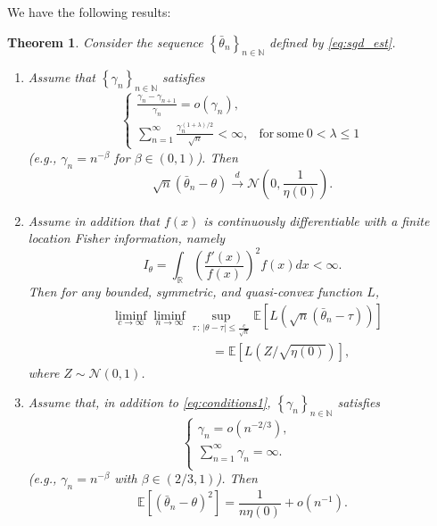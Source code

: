 \documentclass[letterpaper, 11pt]{IEEEtran}      %
\newtheorem{thm}{\bf{Theorem}}
\newcommand{\ex}[1]{\ensuremath{\mathbb{E}\left[ #1\right]}}
\newcommand{\Ncal}{\mathcal{N}}
\begin{document}
We have the following results:
\begin{thm} \label{thm:sgd}
Consider the sequence $\left\{\bar{\theta}_n \right\}_{n\in \mathbb N}$ defined by \eqref{eq:sgd_est}. 
\begin{enumerate}
\item[(i)] Assume that $\left\{ \gamma_n \right\}_{n\in \mathbb N}$ satisfies
\begin{equation} \label{eq:conditions1}
\begin{cases}
\frac{\gamma_n - \gamma_{n+1}}{\gamma_n} = o(\gamma_n), &  \\
\sum_{n=1}^\infty \frac{\gamma_n^{(1+\lambda)/2}} {\sqrt{n}} < \infty, & 
\mathrm{for~some~}0< \lambda \leq 1
\end{cases}
\end{equation}
(e.g., $\gamma_n = n^{-\beta}$ for $\beta \in (0,1)$). Then
\[
\sqrt{n}\left( \bar{\theta}_n - \theta\right) \overset{d}{\to} \Ncal\left(0,\frac{1}{\eta(0)}\right).
\]
%
%
\item [(ii)] Assume in addition that $f(x)$ is continuously differentiable with a finite location Fisher information, namely
\[
I_\theta = \int_{\mathbb R} \left( \frac{f'(x)}{f(x)}  \right)^2 f(x) dx < \infty.
\]
Then for any bounded, symmetric, and quasi-convex function $L$, 
\begin{align} 
& \liminf_{c \to \infty} \liminf_{n \to \infty} \sup_{\tau\,:\,|\theta-\tau| \leq \frac{c}{\sqrt{n} }}  \mathbb E \left[ L\left( \sqrt{n}(\bar{\theta}_{n} - \tau) \right) \right] \nonumber 
\\
& \qquad \qquad \qquad \qquad = \mathbb E \left[ L (Z/\sqrt{\eta(0)}) \right], \label{eq:attaining_LAM}
\end{align}
where $Z \sim \Ncal(0,1)$. 
%
%
\item[(iii)] Assume that, in addition to \eqref{eq:conditions1}, $\left\{ \gamma_n \right\}_{n\in \mathbb N}$ satisfies
\begin{equation} \label{eq:conditions2}
\begin{cases}
\gamma_n = o(n^{-2/3}), &  \\
\sum_{n=1}^\infty \gamma_n = \infty.  & \\
\end{cases}
\end{equation}
(e.g., $\gamma_n = n^{-\beta}$ with $\beta \in (2/3,1)$). Then
\[
 \ex{\left( \bar{\theta}_n - \theta \right)^2} = \frac{1}{n\eta(0)} + o(n^{-1}). 
\]
\end{enumerate}
\end{thm}
\end{document}
